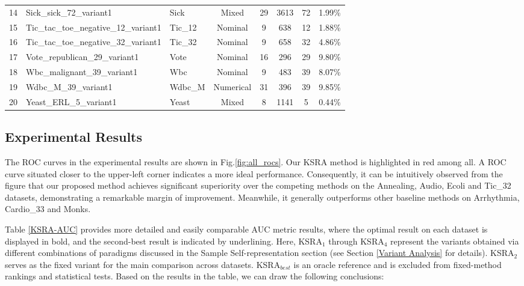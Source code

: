 \documentclass[ASNA,twocolumn]{USG} %
\begin{document}
\begin{table}[!ht]
\begin{tabular}{lllccccc}
            14 & Sick\_sick\_72\_variant1 & Sick & Mixed & 29 & 3613 & 72 & 1.99\% \\
            15 & Tic\_tac\_toe\_negative\_12\_variant1 & Tic\_12 & Nominal & 9 & 638 & 12 & 1.88\% \\
            16 & Tic\_tac\_toe\_negative\_32\_variant1 & Tic\_32 & Nominal & 9 & 658 & 32 & 4.86\% \\
            17 & Vote\_republican\_29\_variant1 & Vote & Nominal & 16 & 296 & 29 & 9.80\% \\
            18 & Wbc\_malignant\_39\_variant1 & Wbc & Nominal & 9 & 483 & 39 & 8.07\% \\
            19 & Wdbc\_M\_39\_variant1 & Wdbc\_M & Numerical & 31 & 396 & 39 & 9.85\% \\
            20 & Yeast\_ERL\_5\_variant1 & Yeast & Mixed & 8 & 1141 & 5 & 0.44\% \\
            \bottomrule
        \end{tabular}
\end{table}


\subsection{Experimental Results}

The ROC curves in the experimental results are shown in Fig.\ref{fig:all_rocs}. Our KSRA method is highlighted in red among all. A ROC curve situated closer to the upper-left corner indicates a more ideal performance. Consequently, it can be intuitively observed from the figure that our proposed method achieves significant superiority over the competing methods on the Annealing, Audio, Ecoli and Tic\_32 datasets, demonstrating a remarkable margin of improvement. Meanwhile, it generally outperforms other baseline methods on Arrhythmia, Cardio\_33 and Monks.

Table \ref{KSRA-AUC} provides more detailed and easily comparable AUC metric results, where the optimal result on each dataset is displayed in bold, and the second-best result is indicated by underlining. Here, KSRA$_1$ through KSRA$_4$ represent the variants obtained via different combinations of paradigms discussed in the Sample Self-representation section (see Section \ref{Variant Analysis} for details). KSRA$_2$ serves as the fixed variant for the main comparison across datasets. KSRA$_{best}$ is an oracle reference and is excluded from fixed-method rankings and statistical tests. Based on the results in the table, we can draw the following conclusions:
\end{document}
